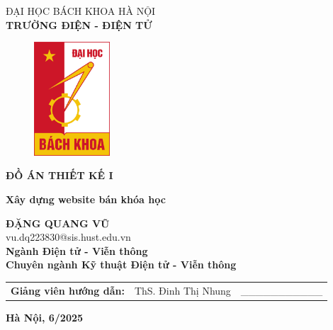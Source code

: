 \documentclass{article}
\begin{document}
	\setmainfont{Times New Roman}
	\thispagestyle{empty}
	\begin{center}
		\vspace{-12pt}  \fontsize{14pt}{0pt}\selectfont ĐẠI HỌC BÁCH KHOA HÀ NỘI \\[6pt]
		\textbf{\fontsize{16pt}{0pt}\selectfont TRƯỜNG ĐIỆN - ĐIỆN TỬ}
		\vspace{1.75cm}
		\begin{figure}[H]
			\centering
			\includegraphics[height=4.25cm]{logoHUST.png}
		\end{figure}
		\vspace{1cm}
		\textbf{\fontsize{25pt}{0pt}\selectfont ĐỒ ÁN THIẾT KẾ I} 
		\vspace{0.5cm}
	\end{center}
	\begin{center}
		\textbf{\fontsize{22pt}{0pt}\selectfont Xây dựng website bán khóa học} \\
		\vspace{2.5cm}
		
		\textbf{\fontsize{18pt}{0pt}\selectfont ĐẶNG QUANG VŨ} \\[6pt]
		\fontsize{16pt}{0pt}\selectfont vu.dq223830@sis.hust.edu.vn \\[6pt]
		\vspace{0.75cm}
		\textbf{\fontsize{16pt}{0pt}\selectfont Ngành Điện tử - Viễn thông} \\[6pt]
		\textbf{\fontsize{16pt}{0pt}\selectfont Chuyên ngành Kỹ thuật Điện tử - Viễn thông} 
		\vspace{0.75cm}
		\begin{table}[H]
			\centering
			\begin{tabular}{l l l}
				\fontsize{16pt}{0pt}\selectfont \textbf{Giảng viên hướng dẫn:}    & \fontsize{16pt}{0pt}\selectfont ThS. Đinh Thị Nhung \vspace{6pt} & \_\_\_\_\_\_\_\_\_\_\_ \\ 
			\end{tabular}
		\end{table}
		\vspace{2.5cm}
		\fontsize{14pt}{0pt}\selectfont \textbf{Hà Nội, 6/2025}
	\end{center}
\end{document}
